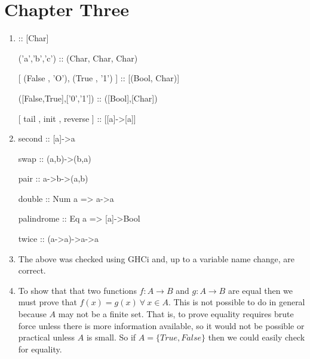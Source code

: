 \documentclass{article}
\begin{document}
\section{Chapter Three}
\begin{enumerate}
\item 
\begin{code}
['a','b','c'] :: [Char]

('a','b','c') :: (Char, Char, Char)

[ (False , 'O'), (True , '1') ]  :: [(Bool, Char)]

([False,True],[’0’,’1’])  :: ([Bool],[Char])

[ tail , init , reverse ] :: [[a]->[a]]
\end{code}

\item 
\begin{code}
second :: [a]->a

swap :: (a,b)->(b,a)

pair :: a->b->(a,b)

double :: Num a => a->a

palindrome :: Eq a => [a]->Bool

twice :: (a->a)->a->a
\end{code}

\item The above was checked using GHCi and, up to a variable name change, are correct. 

\item To show that that two functions $f: A \to B$ and $g:A \to B$ are equal then we must prove that $f(x)=g(x) \ \forall \ x \in A$. This is not possible to do in general because $A$ may not be a finite set. That is, to prove equality requires brute force unless there is more information available, so it would not be possible or practical unless $A$ is small. So if $A=\{True, False\}$ then we could easily check for equality. 
\end{enumerate}
\end{document}
